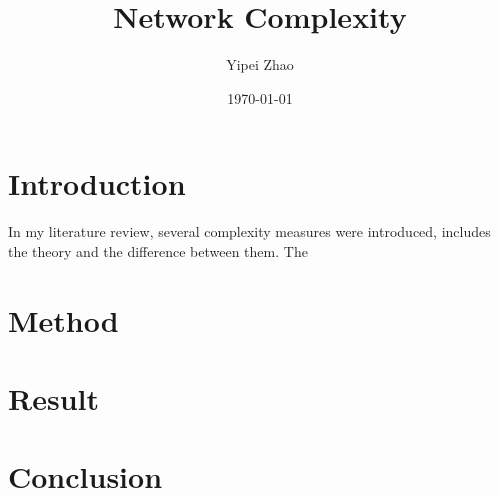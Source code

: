 \documentclass{article}
\title{Network Complexity}
\author{Yipei Zhao}
\date{\today}
\begin{document}
\maketitle

\section{Introduction}
In my literature review, several complexity measures were introduced, includes the theory and the difference between them. 
The

\section{Method}

\section{Result}

\section{Conclusion}

\printbibliography
\end{document}
